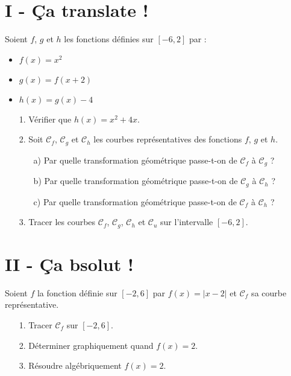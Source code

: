 \documentclass[11pt]{article}
\begin{document}
\setlength{\columnseprule}{1pt}
\begin{multicols}{2}
\section*{I - Ça translate !}
Soient $f$, $g$ et $h$ les fonctions définies sur $[-6, 2]$ par :
\begin{itemize}
  \item $f(x) = x^2$
  \item $g(x) = f(x + 2)$
  \item $h(x) = g(x) - 4$
\end{itemize}

\begin{enumerate}
  \item[1.] Vérifier que $h(x) = x^2 + 4x$.
  \item[2.] Soit $\mathcal{C}_f$, $\mathcal{C}_g$ et $\mathcal{C}_h$ les courbes représentatives des fonctions $f$, $g$ et $h$. \\
  \begin{enumerate}
    \item[a)] Par quelle transformation géométrique passe-t-on de $\mathcal{C}_f$ à $\mathcal{C}_g$ ?
    \item[b)] Par quelle transformation géométrique passe-t-on de $\mathcal{C}_g$ à $\mathcal{C}_h$ ?
    \item[c)] Par quelle transformation géométrique passe-t-on de $\mathcal{C}_f$ à $\mathcal{C}_h$ ?
  \end{enumerate}
  \item[3.] Tracer les courbes $\mathcal{C}_f$, $\mathcal{C}_g$, $\mathcal{C}_h$ et $\mathcal{C}_u$ sur l'intervalle $[-6, 2]$.
\end{enumerate}

\section*{II - Ça bsolut !}
Soient $f$ la fonction définie sur $[-2, 6]$ par $f(x) = |x - 2|$ et $\mathcal{C}_f$ sa courbe représentative.
\begin{enumerate}
  \item[1.] Tracer $\mathcal{C}_f$ sur $[-2, 6]$.
  \item[2.] Déterminer graphiquement quand $f(x) = 2$.
  \item[3.] Résoudre algébriquement $f(x) = 2$.
\end{enumerate}
\end{multicols}
\end{document}
